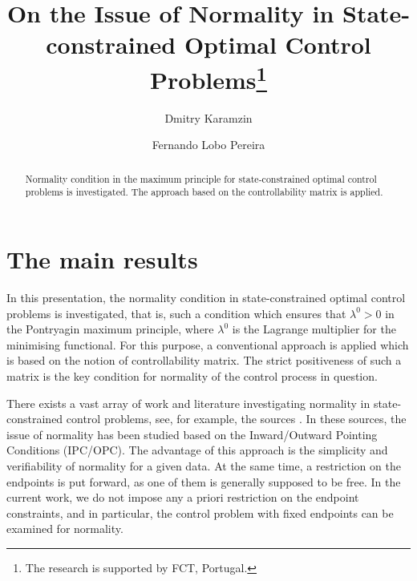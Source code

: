 \documentclass[12pt]{llncs}
\begin{document}
%
\fi

\title{On the Issue of Normality in State-constrained Optimal Control Problems\thanks{The research is supported by FCT, Portugal.}}
\author{Dmitry Karamzin
  \and
  Fernando Lobo Pereira
}

\maketitle

\begin{abstract}
Normality condition in the maximum principle for state-constrained optimal control problems is investigated. The approach based on the controllability matrix is applied.

\end{abstract}

\section{The main results}

In this presentation, the normality condition in state-constrained optimal control problems is investigated, that is, such a condition which ensures
that $\lambda^0>0$ in the Pontryagin maximum principle, where $\lambda^0$ is the Lagrange multiplier for the minimising functional. For this purpose, a conventional approach is applied which is based on the notion of controllability matrix. The strict positiveness of such a matrix is the key condition for normality of the control process in question.

There exists a vast array of work and literature investigating normality in state-constrained control problems, see, for example, the sources \cite{Rampazzo_Vinter_1999,Frankowska_2009,Bettiol_e_al_2016}. In these sources, the issue of normality has been studied based on the Inward/Outward Pointing Conditions (IPC/OPC). The advantage of this approach is the simplicity and verifiability of normality for a given data. At the same time, a restriction on the endpoints is put forward, as one of them is generally supposed to be free. In the current work, we do not impose any a priori restriction on the endpoint constraints, and in particular, the control problem with fixed endpoints can be examined for normality.
\end{document}
